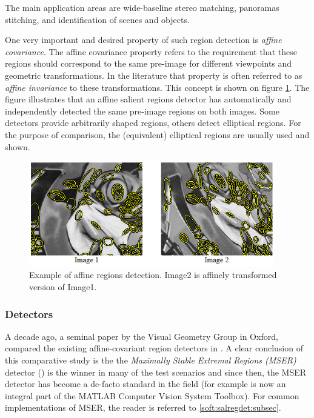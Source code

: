 The main application areas are wide-baseline stereo matching, panoramas stitching,  and identification of scenes and objects. 

One very important and desired property of such region detection is {\em affine covariance}.  The affine covariance property refers to the requirement that these regions should correspond to the same pre-image for different viewpoints and geometric transformations. In the literature that property is often referred to as {\em affine invariance} to these transformations. 
This concept is shown on figure \ref{fig:affreg}. The figure illustrates that an affine salient regions detector has automatically and independently detected the same pre-image regions on both images. Some detectors provide arbitrarily shaped regions, others detect elliptical regions. For the purpose of comparison, the (equivalent) elliptical regions are usually used and shown.
\begin{figure}[H]
\begin{center}
\includegraphics[width=0.95\textwidth]{fig/AffineRegions}
\end{center}
\caption{Example of affine regions detection. Image2 is affinely transformed version of Image1.}
\label{fig:affreg}
\end{figure}

\subsubsection{Detectors}
A decade ago, a seminal paper by the Visual Geometry Group in Oxford, compared the existing affine-covariant region detectors in \cite{Mikolajczyk:2005}. A clear conclusion of this comparative study is the the  {\em  Maximally Stable Extremal Regions (MSER)} detector (\cite{Matas2002BMVC}) is the winner in many of the test scenarios and since then, the MSER detector has become a de-facto standard in the field (for example is now an integral part of the MATLAB Computer Vision System Toolbox). For common implementations of MSER, the reader is referred to \ref{soft:salregdet:subsec}.


